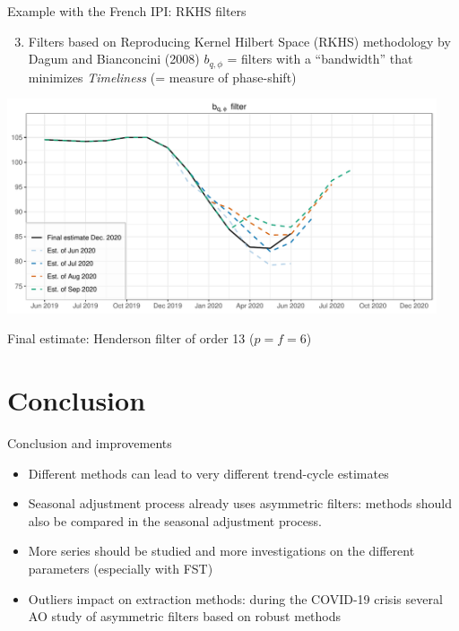 \documentclass[10pt,xcolor=table,color={dvipsnames,usenames},ignorenonframetext,usepdftitle=false,english]{beamer}
\providecommand{\tightlist}{%
  \setlength{\parskip}{0pt}
  }
\newcommand\1{\mathds{1}}
\begin{document}
\begin{frame}{Example with the French IPI: RKHS filters}
\protect\hypertarget{example-with-the-french-ipi-rkhs-filters}{}
\footnotesize

\begin{enumerate}
\setcounter{enumi}{2}
\tightlist
\item
  Filters based on Reproducing Kernel Hilbert Space (RKHS) methodology
  by Dagum and Bianconcini (2008) \faArrowCircleRight{} \(b_{q,\phi}\) =
  filters with a ``bandwidth'' that minimizes \emph{Timeliness} (=
  measure of phase-shift)
\end{enumerate}

\includegraphics[width=0.95\textwidth,height=\textheight]{img/illustration_slides_5.pdf}

Final estimate: Henderson filter of order 13 (\(p=f=6\))
\end{frame}

\hypertarget{conclusion}{%
\section{Conclusion}\label{conclusion}}

\begin{frame}{Conclusion and improvements}
\protect\hypertarget{conclusion-and-improvements}{}
\begin{itemize}
\item
  Different methods can lead to very different trend-cycle estimates
\item
  \bcattention Seasonal adjustment process already uses asymmetric
  filters: methods should also be compared in the seasonal adjustment
  process.
\item
  \bclampe More series should be studied and more investigations on the
  different parameters (especially with FST)
\item
  \bcattention Outliers impact on extraction methods: during the
  COVID-19 crisis several AO \faArrowCircleRight{} study of asymmetric
  filters based on robust methods \bclampe
\end{itemize}
\end{frame}
\end{document}
